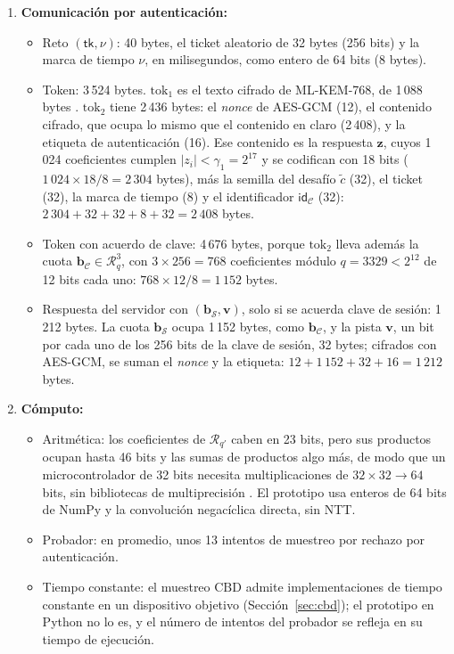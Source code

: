 \begin{enumerate}
    \item \textbf{Comunicación por autenticación:}
    \begin{itemize}
        \item Reto $(\mathsf{tk}, \nu)$: 40 bytes, el ticket aleatorio de 32 bytes (256 bits) y la marca de tiempo $\nu$, en milisegundos, como entero de 64 bits (8 bytes).
        \item Token: 3\,524 bytes. $\text{tok}_1$ es el texto cifrado de ML-KEM-768, de 1\,088 bytes \cite{nist2024fips203}. $\text{tok}_2$ tiene 2\,436 bytes: el \textit{nonce} de AES-GCM (12), el contenido cifrado, que ocupa lo mismo que el contenido en claro (2\,408), y la etiqueta de autenticación (16). Ese contenido es la respuesta $\mathbf{z}$, cuyos 1\,024 coeficientes cumplen $|z_i| < \gamma_1 = 2^{17}$ y se codifican con 18 bits ($1\,024 \times 18 / 8 = 2\,304$ bytes), más la semilla del desafío $\tilde{c}$ (32), el ticket (32), la marca de tiempo (8) y el identificador $\mathsf{id}_{\mathcal{C}}$ (32): $2\,304 + 32 + 32 + 8 + 32 = 2\,408$ bytes.
        \item Token con acuerdo de clave: 4\,676 bytes, porque $\text{tok}_2$ lleva además la cuota $\mathbf{b}_{\mathcal{C}} \in \mathcal{R}_q^3$, con $3 \times 256 = 768$ coeficientes módulo $q = 3329 < 2^{12}$ de 12 bits cada uno: $768 \times 12 / 8 = 1\,152$ bytes.
        \item Respuesta del servidor con $(\mathbf{b}_{\mathcal{S}}, \mathbf{v})$, solo si se acuerda clave de sesión: 1\,212 bytes. La cuota $\mathbf{b}_{\mathcal{S}}$ ocupa 1\,152 bytes, como $\mathbf{b}_{\mathcal{C}}$, y la pista $\mathbf{v}$, un bit por cada uno de los 256 bits de la clave de sesión, 32 bytes; cifrados con AES-GCM, se suman el \textit{nonce} y la etiqueta: $12 + 1\,152 + 32 + 16 = 1\,212$ bytes.
    \end{itemize}

    \item \textbf{Cómputo:}
    \begin{itemize}
        \item Aritmética: los coeficientes de $\mathcal{R}_{q'}$ caben en 23 bits, pero sus productos ocupan hasta 46 bits y las sumas de productos algo más, de modo que un microcontrolador de 32 bits necesita multiplicaciones de $32 \times 32 \to 64$ bits, sin bibliotecas de multiprecisión \cite{mukil2026implementing}. El prototipo usa enteros de 64 bits de NumPy y la convolución negacíclica directa, sin NTT.
        \item Probador: en promedio, unos 13 intentos de muestreo por rechazo por autenticación.
        \item Tiempo constante: el muestreo $\mathrm{CBD}$ admite implementaciones de tiempo constante en un dispositivo objetivo (Sección~\ref{sec:cbd}); el prototipo en Python no lo es, y el número de intentos del probador se refleja en su tiempo de ejecución.
    \end{itemize}
\end{enumerate}

